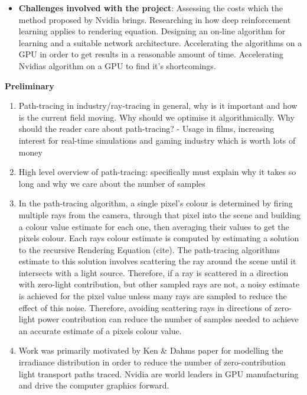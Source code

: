 \documentclass[ %
                    author={Callum Pearce},
                supervisor={Dr. Neill Campbell},
                    degree={MEng},
                     title={How effective are Temporal difference learning methods in reducing the number of zero contribution light paths in Path tracing?},
                  subtitle={},
                      type={research},
                      year={2019} ]{dissertation}
\begin{document}
\begin{itemize}
\item \textbf{Challenges involved with the project}: Assessing the costs which the method proposed by Nvidia brings. Researching in how deep reinforcement learning applies to rendering equation. Designing an on-line algorithm for learning and a suitable network architecture. Accelerating the algorithms on a GPU in order to get results in a reasonable amount of time. Accelerating Nvidias algorithm on a GPU to find it's shortcomings.

\end{itemize}

\textbf{Preliminary}
\begin{enumerate}
\item Path-tracing in industry/ray-tracing in general, why is it important 
and how is the current field moving. Why should we optimise it algorithmically. 
Why should the reader care about path-tracing? - Usage in films, increasing
 interest for real-time simulations and gaming industry which is worth lots of money

\item High level overview of path-tracing: specifically must explain why it takes 
so long and why we care about the number of samples

\item In the path-tracing algorithm, a single pixel's colour is determined by firing 
multiple rays from the camera, through that pixel into the scene and building a 
colour value estimate for each one, then averaging their values to get the pixels 
colour. Each rays colour estimate is computed by estimating a solution to the recursive
Rendering Equation (cite). The path-tracing algorithms estimate to this solution involves 
scattering the ray around the scene until it intersects with a light source. Therefore, if a
 ray is scattered in a direction with zero-light contribution, but other sampled rays are not,
  a noisy estimate is achieved for the pixel value unless many rays are sampled to 
  reduce the effect of this noise. Therefore, avoiding  scattering rays in directions of 
  zero-light power contribution can reduce the number of samples needed to achieve 
  an accurate estimate of a pixels colour value.

\item Work was primarily motivated by Ken \& Dahms paper for modelling the irradiance
 distribution in order to reduce the number of zero-contribution light transport paths 
 traced. Nvidia are world leaders in GPU manufacturing and drive the computer 
 graphics forward.


\end{enumerate}
\end{document}

